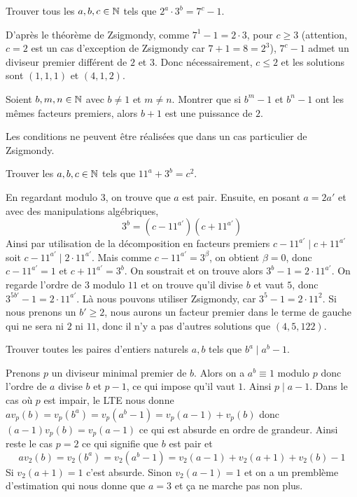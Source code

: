 \begin{exo}
Trouver tous les $a,b,c\in\mathbb N$ tels que $2^a\cdot3^b=7^c-1$.
\end{exo}


\begin{sol}
D'après le théorème de Zsigmondy, comme $7^1-1=2\cdot 3$, pour $c\geq 3$ (attention, $c=2$ est un cas d'exception de Zsigmondy car $7+1=8=2^3$), $7^c-1$ admet un diviseur premier différent de $2$ et $3$. Donc nécessairement, $c\leq 2$ et les solutions sont $(1,1,1)$ et $(4,1,2)$.
\end{sol}


\begin{exo}
Soient $b,m,n\in\mathbb N$ avec $b\neq 1$ et $m\neq n$. Montrer que si $b^m-1$ et $b^n-1$ ont les mêmes facteurs premiers, alors $b+1$ est une puissance de $2$.
\end{exo}


\begin{sol}
Les conditions ne peuvent être réalisées que dans un cas particulier de Zsigmondy.
\end{sol}


\begin{exo}
Trouver les $a,b,c\in\mathbb N$ tels que $11^a+3^b=c^2$.
\end{exo}


\begin{sol}
En regardant modulo $3$, on trouve que $a$ est pair. Ensuite, en posant $a=2a'$ et avec des manipulations algébriques,
$$3^b=(c-11^{a'})(c+11^{a'})$$
Ainsi par utilisation de la décomposition en facteurs premiers $c-11^{a'}\mid c+11^{a'}$ soit $c-11^{a'}\mid 2\cdot 11^{a'}$.\newline
Mais comme $c-11^{a'}=3^\beta$, on obtient $\beta=0$, donc $c-11^{a'}=1$ et $c+11^{a'}=3^b$.\newline
On soustrait et on trouve alors
$3^b-1=2\cdot 11^{a'}$. On regarde l'ordre de $3$ modulo $11$ et on trouve qu'il divise $b$ et vaut $5$, donc $3^{5b'}-1=2\cdot 11^{a'}$. Là nous pouvons utiliser Zsigmondy, car $3^5-1=2\cdot 11^2$. Si nous prenons un $b'\geq 2$, nous aurons un facteur premier dans le terme de gauche qui ne sera ni $2$ ni $11$, donc il n'y a pas d'autres solutions que $(4,5,122)$.
\end{sol}


\begin{exo}
Trouver toutes les paires d'entiers naturels $a,b$ tels que $b^a\mid a^b-1$.
\end{exo}


\begin{sol}
Prenons $p$ un diviseur minimal premier de $b$. Alors on a $a^b\equiv 1$ modulo $p$ donc l'ordre de $a$ divise $b$ et $p-1$, ce qui impose qu'il vaut $1$. Ainsi $p\mid a-1$.
Dans le cas où $p$ est impair,
le LTE nous donne $av_p(b)=v_p(b^a)=v_p(a^b-1)=v_p(a-1)+v_p(b)$ donc $(a-1)v_p(b)=v_p(a-1)$ ce qui est absurde en ordre de grandeur.
Ainsi reste le cas $p=2$ ce qui signifie que $b$ est pair et
$$av_2(b)=v_2(b^a)=v_2(a^b-1)=v_2(a-1)+v_2(a+1)+v_2(b)-1$$
Si $v_2(a+1)=1$ c'est absurde. Sinon $v_2(a-1)=1$ et on a un premblème d'estimation qui nous donne que $a=3$ et ça ne marche pas non plus.
\end{sol}


